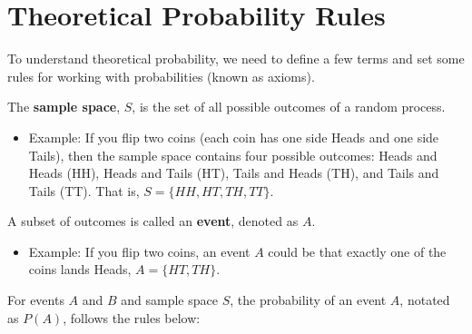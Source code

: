 \documentclass[
]{book}
\providecommand{\tightlist}{%
  \setlength{\itemsep}{0pt}\setlength{\parskip}{0pt}}
\begin{document}
\hypertarget{theoretical-probability-rules}{%
\section{Theoretical Probability Rules}\label{theoretical-probability-rules}}

To understand theoretical probability, we need to define a few terms and set some rules for working with probabilities (known as axioms).

The \textbf{sample space}, \(S\), is the set of all possible outcomes of a random process.

\begin{itemize}
\tightlist
\item
  Example: If you flip two coins (each coin has one side Heads and one side Tails), then the sample space contains four possible outcomes: Heads and Heads (HH), Heads and Tails (HT), Tails and Heads (TH), and Tails and Tails (TT). That is, \(S = \{HH,HT,TH,TT\}\).
\end{itemize}

A subset of outcomes is called an \textbf{event}, denoted as \(A\).

\begin{itemize}
\tightlist
\item
  Example: If you flip two coins, an event \(A\) could be that exactly one of the coins lands Heads, \(A = \{HT,TH\}\).
\end{itemize}

For events \(A\) and \(B\) and sample space \(S\), the probability of an event \(A\), notated as \(P(A)\), follows the rules below:
\end{document}
